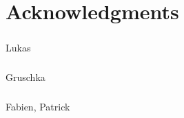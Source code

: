 \documentclass[../main.tex]{subfile}
\begin{document}
\chapter*{Acknowledgments}

\paragraph{} Lukas
\paragraph{} Gruschka
\paragraph{} Fabien, Patrick
\paragraph{} 
\end{document}
